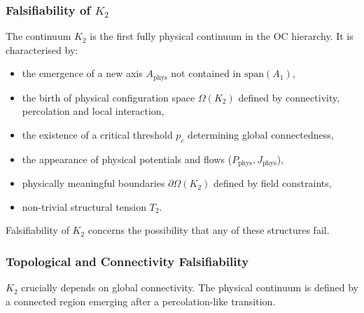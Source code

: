 
\subsubsection{Falsifiability of \texorpdfstring{$K_2$}{K_2}}
\label{sec:falsifiability-k2}

The continuum $K_2$ is the first fully physical continuum in the OC
hierarchy.
It is characterised by:
\begin{itemize}
    \item the emergence of a new axis $A_{\mathrm{phys}}$ not contained
    in $\mathrm{span}(A_1)$,
    \item the birth of physical configuration space $\Omega(K_2)$ defined
    by connectivity, percolation and local interaction,
    \item the existence of a critical threshold $p_c$ determining global
    connectedness,
    \item the appearance of physical potentials and flows
    ($P_{\mathrm{phys}}, J_{\mathrm{phys}}$),
    \item physically meaningful boundaries $\partial\Omega(K_2)$ defined
    by field constraints,
    \item non-trivial structural tension $T_2$.
\end{itemize}

Falsifiability of $K_2$ concerns the possibility that any of these
structures fail.



\subsubsection{Topological and Connectivity Falsifiability}

$K_2$ crucially depends on global connectivity.
The physical continuum is defined by a connected region emerging after a
percolation-like transition.

